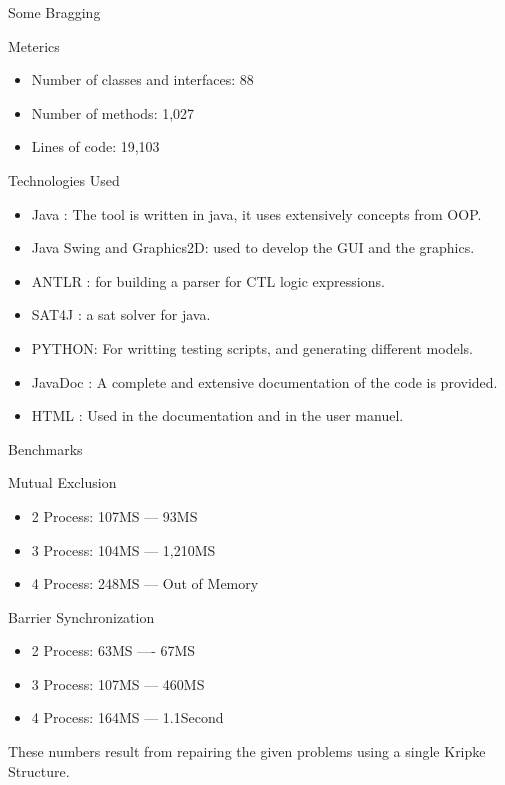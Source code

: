 \documentclass{bredelebeamer}
\begin{document}
\begin{frame}{Some Bragging} %
\begin{block}{Meterics}
\begin{itemize}
\item Number of classes and interfaces: 88
\item Number of methods: 1,027
\item Lines of code: 19,103
\end{itemize}
\end{block}

\begin{block}{Technologies Used}
\begin{itemize}
\item Java : The tool is written in java, it uses extensively concepts from OOP.
\item Java Swing and Graphics2D: used to develop the GUI and the graphics.
\item ANTLR : for building a parser for CTL logic expressions.
\item SAT4J : a sat solver for java.
\item PYTHON: For writting testing scripts, and generating different models.
\item JavaDoc : A complete and extensive documentation of the code is provided.
\item HTML  : Used in the documentation and in the user manuel.
\end{itemize}
\end{block}
\end{frame}

\begin{frame}{Benchmarks} %
\begin{block}{Mutual Exclusion}
\begin{itemize}
\item 2 Process: 107MS --- 93MS
\item 3 Process: 104MS --- 1,210MS
\item 4 Process: 248MS --- Out of Memory
\end{itemize}
\end{block}

\begin{block}{Barrier Synchronization}
\begin{itemize}
\item 2 Process: 63MS ---- 67MS
\item 3 Process: 107MS --- 460MS 
\item 4 Process: 164MS --- 1.1Second
\end{itemize}
\end{block}

\begin{block}{}
These numbers result from repairing the given problems using a single Kripke Structure.
\end{block}
\end{frame}
\end{document}
